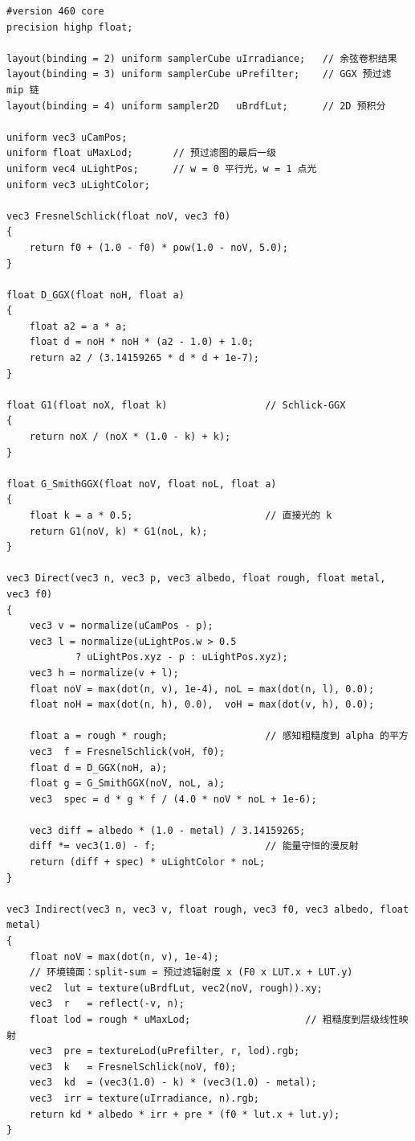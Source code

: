 \documentclass[12pt,a4paper,fontset=fandol]{ctexbook}
\begin{document}
\begin{lstlisting}[style=glslstyle,caption={GGX 直接光与 IBL split-sum：D、G、F 的真实写法},label={lst:ch12-cook}]
#version 460 core
precision highp float;

layout(binding = 2) uniform samplerCube uIrradiance;   // 余弦卷积结果
layout(binding = 3) uniform samplerCube uPrefilter;    // GGX 预过滤 mip 链
layout(binding = 4) uniform sampler2D   uBrdfLut;      // 2D 预积分

uniform vec3 uCamPos;
uniform float uMaxLod;       // 预过滤图的最后一级
uniform vec4 uLightPos;      // w = 0 平行光，w = 1 点光
uniform vec3 uLightColor;

vec3 FresnelSchlick(float noV, vec3 f0)
{
    return f0 + (1.0 - f0) * pow(1.0 - noV, 5.0);
}

float D_GGX(float noH, float a)
{
    float a2 = a * a;
    float d = noH * noH * (a2 - 1.0) + 1.0;
    return a2 / (3.14159265 * d * d + 1e-7);
}

float G1(float noX, float k)                 // Schlick-GGX
{
    return noX / (noX * (1.0 - k) + k);
}

float G_SmithGGX(float noV, float noL, float a)
{
    float k = a * 0.5;                       // 直接光的 k
    return G1(noV, k) * G1(noL, k);
}

vec3 Direct(vec3 n, vec3 p, vec3 albedo, float rough, float metal, vec3 f0)
{
    vec3 v = normalize(uCamPos - p);
    vec3 l = normalize(uLightPos.w > 0.5
            ? uLightPos.xyz - p : uLightPos.xyz);
    vec3 h = normalize(v + l);
    float noV = max(dot(n, v), 1e-4), noL = max(dot(n, l), 0.0);
    float noH = max(dot(n, h), 0.0),  voH = max(dot(v, h), 0.0);

    float a = rough * rough;                 // 感知粗糙度到 alpha 的平方
    vec3  f = FresnelSchlick(voH, f0);
    float d = D_GGX(noH, a);
    float g = G_SmithGGX(noV, noL, a);
    vec3  spec = d * g * f / (4.0 * noV * noL + 1e-6);

    vec3 diff = albedo * (1.0 - metal) / 3.14159265;
    diff *= vec3(1.0) - f;                   // 能量守恒的漫反射
    return (diff + spec) * uLightColor * noL;
}

vec3 Indirect(vec3 n, vec3 v, float rough, vec3 f0, vec3 albedo, float metal)
{
    float noV = max(dot(n, v), 1e-4);
    // 环境镜面：split-sum = 预过滤辐射度 x (F0 x LUT.x + LUT.y)
    vec2  lut = texture(uBrdfLut, vec2(noV, rough)).xy;
    vec3  r   = reflect(-v, n);
    float lod = rough * uMaxLod;                    // 粗糙度到层级线性映射
    vec3  pre = textureLod(uPrefilter, r, lod).rgb;
    vec3  k   = FresnelSchlick(noV, f0);
    vec3  kd  = (vec3(1.0) - k) * (vec3(1.0) - metal);
    vec3  irr = texture(uIrradiance, n).rgb;
    return kd * albedo * irr + pre * (f0 * lut.x + lut.y);
}
\end{lstlisting}
\end{document}
